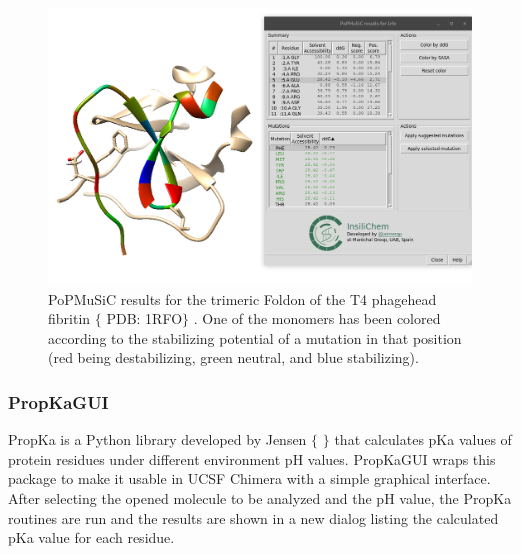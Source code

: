 \begin{figure} %
	\begin{Center}
		\includegraphics[width=\textwidth]{./figures/05/tangram_popmusic.png}
	\end{Center}
	\cprotect\caption[Tangram PoPMuSiC GUI]{PoPMuSiC results for the trimeric Foldon of the T4 phagehead fibritin $ \{ $ PDB: 1RFO$ \} $ . One of the monomers has been colored according to the stabilizing potential of a mutation in that position (red being destabilizing, green neutral, and blue stabilizing).}
	\label{fig:tangram-popmusic}
\end{figure}


\subsubsection{PropKaGUI}
PropKa is a Python library developed by Jensen $ \{ $ $ \} $  that calculates pKa values of protein residues under different environment pH values. PropKaGUI wraps this package to make it usable in UCSF Chimera with a simple graphical interface. After selecting the opened molecule to be analyzed and the pH value, the PropKa routines are run and the results are shown in a new dialog listing the calculated pKa value for each residue. 

